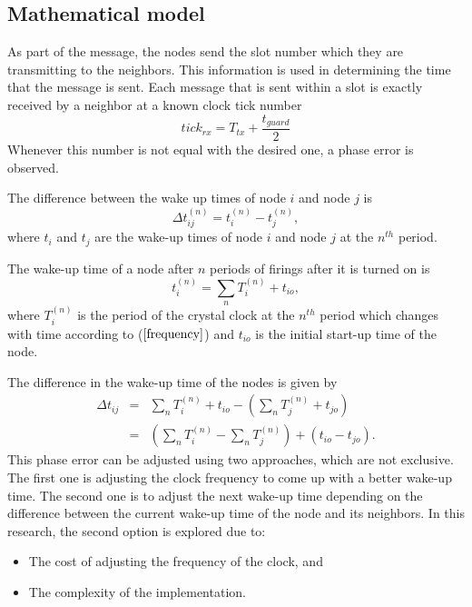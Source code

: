 \documentclass[journal]{IEEEtran}
\begin{document}
\subsection{\textbf{Mathematical model}}
As part of the message, the nodes send the slot number which they
are transmitting to the neighbors. This information is used in
determining the time that the message is sent. Each message that is
sent within a slot is exactly received by a neighbor at a known
clock tick number
\begin{equation}
tick_{rx} = T_{tx}+ \frac{t_{guard}}{2} \label{tick}
\end{equation}
Whenever this number is not equal with the desired one, a phase error is observed. \par
The difference between the wake up times of node $i$ and node $j$ is
\begin{equation}
\Delta t_{ij}^{(n)} = t_i^{(n)} - t_j^{(n)} ,
\end{equation}
where $t_i$ and $t_j$ are the wake-up times of node $i$ and node $j$
at the $n^{th}$ period. \par
The wake-up time of a node after $n$ periods of firings after it is turned on is
\begin{equation}
t_i^{(n)} = \sum_{n} T_i^{(n)} + t_{io},
\end{equation}
where  $T_i^{(n)}$ is the period of the crystal clock at the $n^{th}$ period which changes with time according to ($\ref{frequency}$) and $t_{io}$ is the initial start-up time of the node.\par
The difference in the wake-up time of the nodes is given by
\begin{eqnarray}
\Delta t_{ij} & = & \sum_{n}T_i^{(n)} + t_{io}- (\sum_{n}T_j^{(n)} +
t_{jo}) \\ &=& (\sum_{n}T_i^{(n)} - \sum_{n}T_j^{(n)}) +
(t_{io}-t_{jo}).
\end{eqnarray}
This phase error can be adjusted using two approaches, which are not exclusive. The first
one is adjusting the clock frequency to come up with a better
wake-up time. The second one is to adjust the next wake-up time
depending on the difference between the current wake-up time of the
node and its neighbors. In this research, the second option is
explored due to:
\begin{itemize}
\item The cost of adjusting the frequency of the clock, and
\item The complexity of the implementation.
\end{itemize}
\end{document}
